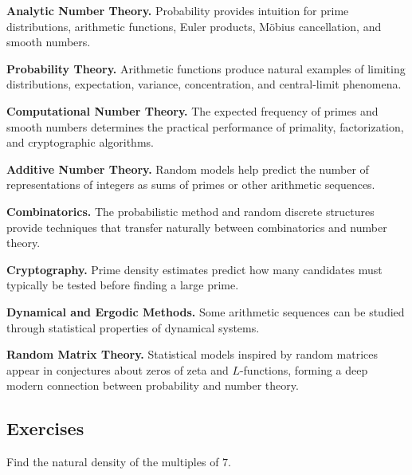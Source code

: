 \begin{applicationbox}
\textbf{Analytic Number Theory.}
Probability provides intuition for prime distributions, arithmetic functions,
Euler products, Möbius cancellation, and smooth numbers.

\medskip

\textbf{Probability Theory.}
Arithmetic functions produce natural examples of limiting distributions,
expectation, variance, concentration, and central-limit phenomena.

\medskip

\textbf{Computational Number Theory.}
The expected frequency of primes and smooth numbers determines the practical
performance of primality, factorization, and cryptographic algorithms.

\medskip

\textbf{Additive Number Theory.}
Random models help predict the number of representations of integers as sums
of primes or other arithmetic sequences.

\medskip

\textbf{Combinatorics.}
The probabilistic method and random discrete structures provide techniques
that transfer naturally between combinatorics and number theory.

\medskip

\textbf{Cryptography.}
Prime density estimates predict how many candidates must typically be tested
before finding a large prime.

\medskip

\textbf{Dynamical and Ergodic Methods.}
Some arithmetic sequences can be studied through statistical properties of
dynamical systems.

\medskip

\textbf{Random Matrix Theory.}
Statistical models inspired by random matrices appear in conjectures about
zeros of zeta and \(L\)-functions, forming a deep modern connection between
probability and number theory.
\end{applicationbox}

\subsection{Exercises}
\label{subsec:probabilistic-number-theory-exercises}

\begin{exercise}[1]
Find the natural density of the multiples of \(7\).
\end{exercise}

